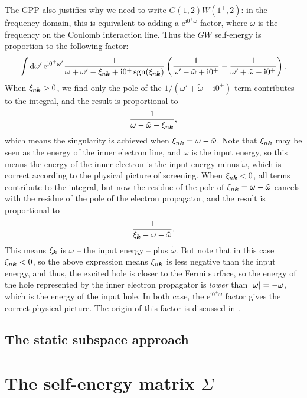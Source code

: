 \documentclass[hyperref, a4paper, 12pt]{report}
\DeclareMathOperator{\sgn}{sgn}
\newcommand*{\ii}{\mathrm{i}}
\newcommand*{\ee}{\mathrm{e}}
\begin{document}
The GPP also justifies why we need to write $G(1, 2) W(1^+, 2)$: 
in the frequency domain, 
this is equivalent to adding a $\ee^{\ii 0^+ \omega}$ factor,
where $\omega$ is the frequency on the Coulomb interaction line.
Thus the $GW$ self-energy is proportion to the following factor:
\[
    \int \dd{\omega'} \ee^{\ii 0^+ \omega'} 
    \frac{1}{\omega + \omega' - \xi_{n \vb*{k}} + \ii 0^+ \sgn(\xi_{n \vb*{k}})}
    \left(
        \frac{1}{\omega' - \tilde{\omega} + \ii 0^+}
        - \frac{1}{\omega' + \tilde{\omega} - \ii 0^+}
    \right).
\]
When $\xi_{n \vb*{k}} > 0$, we find only the pole of the $1 / (\omega' + \tilde{\omega} - \ii 0^+)$ term  
contributes to the integral, 
and the result is proportional to 
\[
    \frac{1}{\omega - \tilde{\omega} - \xi_{n \vb*{k}}},
\]
which means the singularity is achieved when 
$\xi_{n \vb*{k}} = \omega - \tilde{\omega}$.
Note that $\xi_{n \vb*{k}}$ may be seen as the energy of the inner electron line, 
and $\omega$ is the input energy, 
so this means the energy of the inner electron 
is the input energy minus $\tilde{\omega}$,
which is correct according to the physical picture of screening.
When $\xi_{n \vb*{k}} < 0$, 
all terms contribute to the integral, 
but now the residue of the pole of $\xi_{n \vb*{k}} = \omega - \tilde{\omega}$ 
cancels with the residue of the pole of the electron propagator,
and the result is proportional to 
\[
    \frac{1}{\xi_{\vb*{k}} - \omega - \tilde{\omega}}.
\]
This means $\xi_{\vb*{k}}$ is $\omega$ -- the input energy -- plus $\tilde{\omega}$.
But note that in this case $\xi_{n \vb*{k}} < 0$,
so the above expression means $\xi_{n \vb*{k}}$ is less negative than the input energy,
and thus, the excited hole is closer to the Fermi surface, 
so the energy of the hole represented by the inner electron propagator 
is \emph{lower} than $\abs{\omega} = - \omega$,
which is the energy of the input hole. 
In both case, the $\ee^{\ii 0^+ \omega}$ factor 
gives the correct physical picture. 
The origin of this factor is discussed in .

\subsection{The static subspace approach}

\section{The self-energy matrix $\Sigma$}
\end{document}
